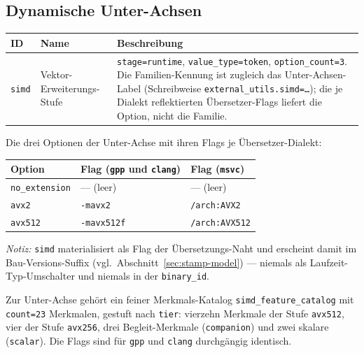 \subsection*{Dynamische Unter-Achsen}

\begin{scriptsize}
\begin{longtable}{@{}>{\raggedright\arraybackslash}p{1.8cm} >{\raggedright\arraybackslash}p{3.2cm} >{\raggedright\arraybackslash}p{8.5cm}@{}}
\toprule
ID & Name & Beschreibung \\
\midrule
\endhead%
\texttt{simd} & Vektor-Erweiterungs-Stufe & \texttt{stage=runtime}, \texttt{value\_\allowbreak{}type=token}, \texttt{option\_\allowbreak{}count=3}. Die Familien-Kennung ist zugleich das Unter-Achsen-Label (Schreibweise \texttt{external\_\allowbreak{}utils.simd=\dots}); die je Dialekt reflektierten Übersetzer-Flags liefert die Option, nicht die Familie. \\
\bottomrule
\end{longtable}
\end{scriptsize}

Die drei Optionen der Unter-Achse mit ihren Flags je Übersetzer-Dialekt:

\begin{scriptsize}
\begin{longtable}{@{}>{\raggedright\arraybackslash}p{3.0cm} >{\raggedright\arraybackslash}p{5.2cm} >{\raggedright\arraybackslash}p{5.3cm}@{}}
\toprule
Option & Flag (\texttt{gpp} und \texttt{clang}) & Flag (\texttt{msvc}) \\
\midrule
\endhead%
\texttt{no\_\allowbreak{}extension} & --- (leer) & --- (leer) \\
\texttt{avx2} & \texttt{-mavx2} & \texttt{/arch:AVX2} \\
\texttt{avx512} & \texttt{-mavx512f} & \texttt{/arch:AVX512} \\
\bottomrule
\end{longtable}
\end{scriptsize}

\emph{Notiz:} \texttt{simd} materialisiert als Flag der Übersetzungs-Naht und erscheint damit im Bau-Versions-Suffix (vgl.\ Abschnitt~\ref{sec:stamp-model}) --- niemals als Laufzeit-Typ-Umschalter und niemals in der \texttt{binary\_\allowbreak{}id}.

Zur Unter-Achse gehört ein feiner Merkmals-Katalog \texttt{simd\_\allowbreak{}feature\_\allowbreak{}catalog} mit \texttt{count=23} Merkmalen, gestuft nach \texttt{tier}: vierzehn Merkmale der Stufe \texttt{avx512}, vier der Stufe \texttt{avx256}, drei Begleit-Merkmale (\texttt{companion}) und zwei skalare (\texttt{scalar}). Die Flags sind für \texttt{gpp} und \texttt{clang} durchgängig identisch.

